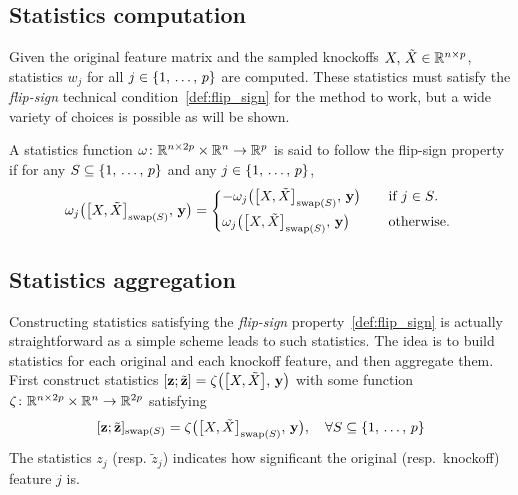 \subsection{Statistics computation}\label{subsec:ksc}

Given the original feature matrix and the sampled knockoffs $X,\, \tilde{X} \in \mathbb{R}^{n \times p}$,
statistics $w_j$ for all $j \in \left\{ 1,\, \dots,\, p \right\}$ are computed.
These statistics must satisfy the \emph{flip-sign} technical condition~\ref{def:flip_sign} for the method to work,
but a wide variety of choices is possible as will be shown.
\begin{definition}\label{def:flip_sign}
        A statistics function $\omega \colon \mathbb{R}^{n \times 2p} \times \mathbb{R}^n \to \mathbb{R}^p$
        is said to follow the flip-sign property if for any $S \subseteq \left\{ 1,\, \dots,\, p \right\}$ and any $j \in \left\{ 1,\, \dots,\, p \right\}$,
        \begin{equation*}
                \omega_j\big( \big[ X, \tX \big]_{\swap(S)},\, \yy \big) = \begin{cases*}
                        -\omega_j\big( \big[ X, \tX \big]_{\swap(S)},\, \yy \big) &\quad\text{if $j \in S$.}\\
                        \omega_j\big( \big[ X, \tX \big]_{\swap(S)},\, \yy \big) &\quad\text{otherwise.}
                \end{cases*}
        \end{equation*}
\end{definition}

\subsection{Statistics aggregation}\label{subsec:ksa}

Constructing statistics satisfying the \emph{flip-sign} property~\ref{def:flip_sign} is actually straightforward
as a simple scheme leads to such statistics.
The idea is to build statistics for each original and each knockoff feature, and then aggregate them.
First construct statistics $[ \mathbf{z} ; \tilde{\mathbf{z}} ] = \zeta\big( \big[ X, \tilde{X} \big],\, \mathbf{y} \big)$
with some function $\zeta \colon \mathbb{R}^{n \times 2p} \times \mathbb{R}^n \to \mathbb{R}^{2p}$ satisfying
\begin{equation}\label{eq:swap_cond}
        [ \mathbf{z} ; \tilde{\mathbf{z}} ]_{\operatorname{swap}(S)} = \zeta\big( \big[ X, \tilde{X} \big]_{\operatorname{swap}(S)},\, \mathbf{y} \big)
        ,\quad
        \forall S \subseteq \left\{ 1,\, \dots,\, p \right\}
\end{equation}
The statistics $z_j$ (resp. $\tilde{z}_j$) indicates how significant the original (resp.\ knockoff) feature $j$ is.

